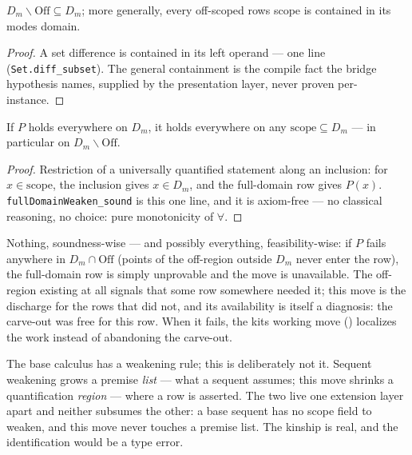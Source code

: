 \begin{bprop}\label{prop:fdw-identity}
$D_m \smallsetminus \mathrm{Off} \subseteq D_m$; more generally, every
off-scoped row\textquotesingle s scope is contained in its
mode\textquotesingle s domain.
\end{bprop}
\begin{proof}
A set difference is contained in its left operand --- one line
(\texttt{Set.diff\_subset}). The general containment is the compile
fact the bridge hypothesis names, supplied by the presentation layer,
never proven per-instance.
\end{proof}

\begin{bprop}\label{prop:fdw-sound}
If $P$ holds everywhere on $D_m$, it holds everywhere on any
$\mathrm{scope} \subseteq D_m$ --- in particular on
$D_m \smallsetminus \mathrm{Off}$.
\end{bprop}
\begin{proof}
Restriction of a universally quantified statement along an inclusion:
for $x \in \mathrm{scope}$, the inclusion gives $x \in D_m$, and the
full-domain row gives $P(x)$. \texttt{fullDomainWeaken\_sound} is this
one line, and it is axiom-free --- no classical reasoning, no choice:
pure monotonicity of $\forall$.
\end{proof}

\begin{bremark}
Nothing, soundness-wise --- and possibly everything,
feasibility-wise: if $P$ fails anywhere in $D_m \cap \mathrm{Off}$
(points of the off-region outside $D_m$ never enter the row), the
full-domain row is simply unprovable and the move is unavailable. The
off-region existing at all signals that some row somewhere needed it;
this move is the discharge for the rows that did not, and its
availability is itself a diagnosis: the carve-out was free for this
row. When it fails, the kit\textquotesingle s working move
() localizes the work instead of abandoning
the carve-out.
\end{bremark}

\begin{bremark}
The base calculus has a weakening rule; this is deliberately not it.
Sequent weakening grows a premise \emph{list} --- what a sequent
assumes; this move shrinks a quantification \emph{region} --- where a
row is asserted. The two live one extension layer apart and neither
subsumes the other: a base sequent has no scope field to weaken, and
this move never touches a premise list. The kinship is real, and the
identification would be a type error.
\end{bremark}

